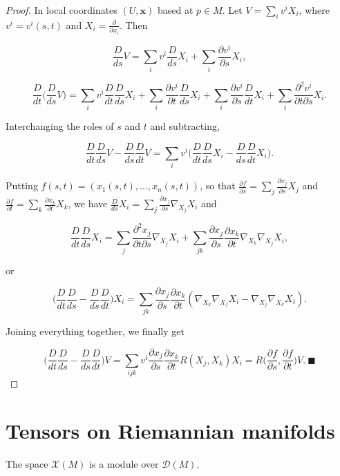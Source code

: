 \begin{proof}
  \sketch
  In local coordinates
  $(U,\mathbf{x})$ based at $p\in M$. Let $V=\sum_i v^i X_i$, where $v^i=v^i(s,t)$ and
  $X_i=\frac{\partial}{\partial x_i}$. Then

  $$
  \frac{D}{ds}V=\sum_i v^i\frac{D}{ds}X_i+\sum_i\frac{\partial v^i}{\partial s}X_i,
  $$

  $$
  \frac{D}{dt}\Big(\frac{D}{ds}V\Big)=\sum_i v^i\frac{D}{dt}\frac{D}{ds}X_i+\sum_i\frac{\partial v^i}{\partial t}\frac{D}{ds}X_i+\sum_i\frac{\partial v^i}{\partial s}\frac{D}{dt}X_i+\sum_i\frac{\partial^2 v^i}{\partial t\partial s}X_i.
  $$

  Interchanging the roles of $s$ and $t$ and subtracting,

  $$
  \frac{D}{dt}\frac{D}{ds}V-\frac{D}{ds}\frac{D}{dt}V=\sum_i v^i\Big(\frac{D}{dt}\frac{D}{ds}X_i-\frac{D}{ds}\frac{D}{dt}X_i\Big).
  $$

  Putting $f(s,t)=(x_1(s,t),\dots,x_n(s,t))$, so that
  $\frac{\partial f}{\partial s}=\sum_j\frac{\partial x_j}{\partial s}X_j$ and
  $\frac{\partial f}{\partial t}=\sum_k\frac{\partial x_k}{\partial t}X_k$, we have
  $\frac{D}{ds}X_i=\sum_j\frac{\partial x_j}{\partial s}\nabla_{X_j}X_i$ and

  $$
  \frac{D}{dt}\frac{D}{ds}X_i=\sum_j\frac{\partial^2 x_j}{\partial t\partial s}\nabla_{X_j}X_i+\sum_{jk}\frac{\partial x_j}{\partial s}\frac{\partial x_k}{\partial t}\nabla_{X_k}\nabla_{X_j}X_i,
  $$

  or

  $$
  \Big(\frac{D}{dt}\frac{D}{ds}-\frac{D}{ds}\frac{D}{dt}\Big)X_i=\sum_{jk}\frac{\partial x_j}{\partial s}\frac{\partial x_k}{\partial t}(\nabla_{X_k}\nabla_{X_j}X_i-\nabla_{X_j}\nabla_{X_k}X_i).
  $$

  Joining everything together, we finally get

  $$
  \Big(\frac{D}{dt}\frac{D}{ds}-\frac{D}{ds}\frac{D}{dt}\Big)V=\sum_{ijk}v^i\frac{\partial x_j}{\partial s}\frac{\partial x_k}{\partial t}R(X_j,X_k)X_i=R\Big(\frac{\partial f}{\partial s},\frac{\partial f}{\partial t}\Big)V.\ \blacksquare
  $$
\end{proof}

\section{Tensors on Riemannian manifolds}

The space $\mathcal{X}(M)$ is a module over $\mathcal{D}(M)$.

